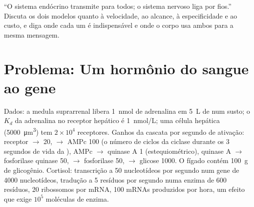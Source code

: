 \begin{exercise}[$\star\star\star$]\label{exo:b2:cell-signalling:12}
``O sistema endócrino transmite para todos; o sistema nervoso liga por
fios.'' Discuta os dois modelos quanto à velocidade, ao alcance, à
especificidade e ao custo, e diga onde cada um é indispensável e onde o
corpo usa ambos para a mesma mensagem.
\end{exercise}

\section{Problema: Um hormônio do sangue ao gene}

\begin{problem}
\label{pb:b2:cell-signalling:1}
Dados: a medula suprarrenal libera \qty{1}{nmol} de adrenalina em
\qty{5}{L} de  num susto; o $K_d$ da adrenalina no receptor
hepático é \qty{1}{nmol/L}; uma célula hepática (\qty{5000}{\micro m^3})
tem $2\times 10^{4}$ receptores. Ganhos da cascata por segundo de
ativação: receptor $\to$  20,  $\to$ AMPc 100 (o
número de ciclos da ciclase durante os 3 segundos de vida da ), AMPc $\to$ quinase A 1 (estequiométrico), quinase A $\to$
fosforilase quinase 50, $\to$ fosforilase 50, $\to$ glicose 1000. O
fígado contém \qty{100}{g} de glicogênio. Cortisol: transcrição a
\qty{50}{} nucleotídeos por segundo num gene de \qty{4000}{}
nucleotídeos, tradução a \qty{5}{} resíduos por segundo numa enzima de
\num{600} resíduos, \num{20} ribossomos por mRNA, \num{100} mRNAs
produzidos por hora, um efeito que exige $10^{5}$ moléculas de enzima.


\end{problem}
